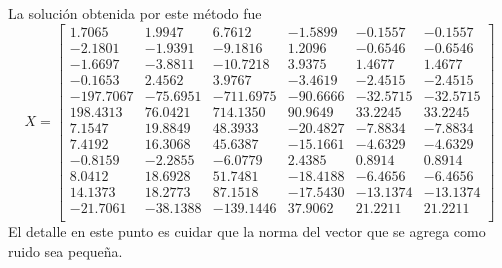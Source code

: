 \documentclass[paper=letter, fontsize=11pt]{scrartcl}
\numberwithin{equation}{section} %
\numberwithin{figure}{section} %
\numberwithin{table}{section} %
\begin{document}
\begin{enumerate}
\begin{enumerate}
La solución obtenida por este método fue 
\[ X =
\begin{bmatrix}
    1.7065&   1.9947  &  6.7612 & -1.5899  &-0.1557 & -0.1557\\
   -2.1801 & -1.9391 &  -9.1816  & 1.2096  &-0.6546  &-0.6546\\
   -1.6697 & -3.8811  &-10.7218  & 3.9375 &  1.4677  & 1.4677\\
   -0.1653 &  2.4562  &  3.9767  &-3.4619  &-2.4515  &-2.4515\\
 -197.7067 &-75.6951 &-711.6975 &-90.6666 &-32.5715 &-32.5715\\
  198.4313 & 76.0421 & 714.1350 & 90.9649  &33.2245  &33.2245\\
    7.1547 & 19.8849 &  48.3933 &-20.4827  &-7.8834  &-7.8834\\
    7.4192 & 16.3068 &  45.6387 &-15.1661  &-4.6329  &-4.6329\\
   -0.8159 & -2.2855 &  -6.0779  & 2.4385  & 0.8914  & 0.8914\\
    8.0412 & 18.6928  & 51.7481 &-18.4188  &-6.4656  &-6.4656\\
   14.1373 & 18.2773 &  87.1518 &-17.5430 &-13.1374 &-13.1374\\
-21.7061 &-38.1388 &-139.1446  &37.9062&  21.2211 & 21.2211\\
\end{bmatrix}
\]
El detalle en este punto es cuidar que la norma del vector que se agrega como ruido sea pequeña.

\end{enumerate}

\end{enumerate}
\end{document}
